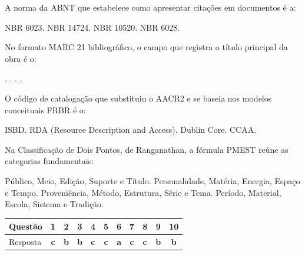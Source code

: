 \documentclass[11pt,a4paper,addpoints]{exam}
\newif\ifinstrucoes
\newcommand{\instrucao}[1]{\ifinstrucoes{\color{gray}\small\itshape #1\par}\fi}
\begin{document}
\begin{questions}
\question[1] A norma da ABNT que estabelece como apresentar citações em documentos é a:
\begin{choices}
  \choice NBR 6023.
  \choice NBR 14724.
  \CorrectChoice NBR 10520.
  \choice NBR 6028.
\end{choices}

\question[1] No formato MARC 21 bibliográfico, o campo que registra o título principal da obra é o:
\begin{choices}
  .
  .
  .
  .
\end{choices}

\question[1] O código de catalogação que substituiu o AACR2 e se baseia nos modelos conceituais FRBR é o:
\begin{choices}
  \choice ISBD.
  \CorrectChoice RDA (Resource Description and Access).
  \choice Dublin Core.
  \choice CCAA.
\end{choices}

\question[1] Na Classificação de Dois Pontos, de Ranganathan, a fórmula PMEST reúne as categorias fundamentais:
\begin{choices}
  \choice Público, Meio, Edição, Suporte e Título.
  \CorrectChoice Personalidade, Matéria, Energia, Espaço e Tempo.
  \choice Proveniência, Método, Estrutura, Série e Tema.
  \choice Período, Material, Escola, Sistema e Tradição.
\end{choices}

\end{questions}

\vspace{3ex}
\instrucao{O quadro abaixo facilita a correção. Na versão do professor ele traz o gabarito; na do aluno, fica em branco.}
\newcommand{\resp}[1]{\ifprintanswers\textcolor{vinho}{\textbf{#1}}\fi}
\begin{center}
  \renewcommand{\arraystretch}{1.4}
  \begin{tabular}{l*{10}{c}}
    \toprule
    Questão & 1 & 2 & 3 & 4 & 5 & 6 & 7 & 8 & 9 & 10 \\
    \midrule
    Resposta & \resp{c} & \resp{b} & \resp{b} & \resp{c} & \resp{c} & \resp{a} & \resp{c} & \resp{c} & \resp{b} & \resp{b} \\
    \bottomrule
  \end{tabular}
\end{center}
\end{document}
